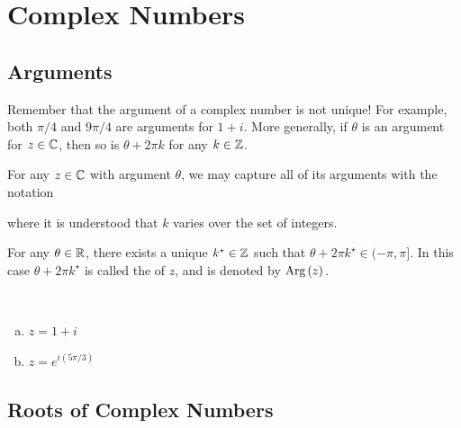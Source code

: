 \documentclass[11pt,fleqn,dvipsnames,usenames]{article}
\renewcommand{\headrulewidth}{1pt}
\newcommand{\p}{\noindent}
\begin{document}
\fancyhead[L]{\course}
\fancyhead[R]{\term}
\renewcommand{\headrulewidth}{0.4pt}


\setcounter{section}{1}
\section{Complex Numbers}
\setcounter{subsection}{3}
\subsection{Arguments}

\p Remember that the argument of a complex number is not unique!  For example, both $\pi/4$ and $9\pi/4$ are arguments for $1 + i$.  More generally, if $\theta$ is an argument for $z\in\mathbb{C}$, then so is $\theta + 2\pi k$ for any $k\in \mathbb{Z}$.
\vsp

\notation For any $z\in\mathbb{C}$ with argument $\theta$, we may capture all of its arguments with the notation
\vspace{2cm}

\p where it is understood that $k$ varies over the set of integers.
\vsp

\fact For any $\theta\in\mathbb{R}$, there exists a unique $k^{\star}\in\mathbb{Z}$ such that $\theta + 2\pi k^{\star}\in (-\pi, \pi]$.  In this case $\theta + 2\pi k^{\star}$ is called the  of $z$, and is denoted by $\text{Arg}\left(z\right)$.
\vsp

\begin{examples}~
\begin{enumerate}[(a)]
\item $z = 1 + i$
\vspace{1cm}

\item $z = e^{i(5\pi/3)}$
\vspace{1cm}

\end{enumerate}
\end{examples}

\subsection{Roots of Complex Numbers}\label{rootsofunitysection}
\end{document}
